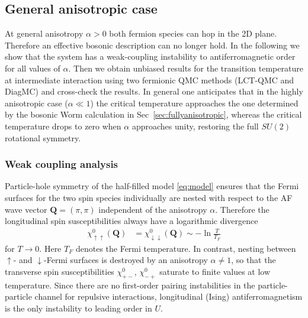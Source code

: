 \documentclass[twocolumn,superscriptaddress,pra,showpacs,longbibliography]{revtex4-1}
\newcommand{\<}{\langle}
\renewcommand{\>}{\rangle}
\begin{document}
\subsection{General anisotropic case~\label{sec:generalanisotropic}}

At general anisotropy $\alpha>0$ both fermion species can hop in the 2D plane. Therefore an effective bosonic description can no longer hold. In the following we show that the system has a weak-coupling instability to antiferromagnetic order for all values of $\alpha$. Then we obtain unbiased results for the transition temperature at intermediate interaction using two fermionic QMC methods (LCT-QMC and DiagMC) and cross-check the results. In general one anticipates that in the highly anisotropic case ($\alpha \ll 1$) the critical temperature approaches the one determined by the bosonic Worm calculation in Sec~\ref{sec:fullyanisotropic}, whereas the critical temperature drops to zero when $\alpha$ approaches unity, restoring the full $SU(2)$ rotational symmetry. 

\subsubsection{Weak coupling analysis} \label{sec:weakcoupling}

Particle-hole symmetry of the half-filled model \eqref{eq:model} ensures that the Fermi surfaces for the two spin species individually are nested with respect to the AF wave vector $\pmb{Q}=(\pi, \pi)$ independent of the anisotropy $\alpha$. Therefore the longitudinal spin susceptibilities always have a logarithmic divergence
\begin{align} \label{eq:chilong}
\chi^{0}_{\uparrow \uparrow}(\pmb{Q}) &= \chi^{0}_{\downarrow \downarrow}(\pmb{Q}) \sim -\ln \frac{T}{T_F}
\end{align}
for $T \to 0$. Here $T_F$ denotes the Fermi temperature.
In contrast, nesting between $\uparrow$- and $\downarrow$-Fermi surfaces is destroyed by an anisotropy $\alpha \neq 1$, so that the transverse spin susceptibilities $\chi^{0}_{+-}$, $\chi^{0}_{-+}$ saturate to finite values at low temperature.
Since there are no first-order pairing instabilities in the particle-particle channel for repulsive interactions, longitudinal (Ising) antiferromagnetism is the only instability to leading order in $U$.
\end{document}
